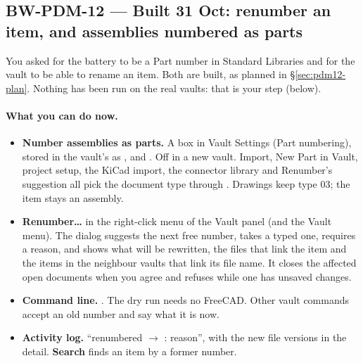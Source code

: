 \subsection{BW-PDM-12 --- Built 31 Oct: renumber an item, and assemblies numbered as parts}\label{sec:pdm12-built}

You asked for the battery to be a Part number in Standard Libraries and for the vault to be able to rename an item.
Both are built, as planned in \S\ref{sec:pdm12-plan}. Nothing has been run on the real vaults: that is your step
(below).

\paragraph{What you can do now.}
\begin{itemize}[nosep]
  \item \textbf{Number assemblies as parts.} A box in Vault Settings (Part numbering), stored in the vault's
         as , and
        . Off in a new vault. Import, New Part in Vault,
        project setup, the KiCad import, the connector library and Renumber's suggestion all pick the document type
        through . Drawings keep type 03; the item stays an assembly.
  \item \textbf{Renumber\ldots} in the right-click menu of the Vault panel (and the Vault menu). The dialog
        suggests the next free number, takes a typed one, requires a reason, and shows what will be rewritten, the
        files that link the item and the items in the neighbour vaults that link its file name. It closes the
        affected open documents when you agree and refuses while one has unsaved changes.
  \item \textbf{Command line.} . The dry run needs no FreeCAD. Other vault commands accept an old number and say what it is now.
  \item \textbf{Activity log.} ``renumbered  $\to$ : reason'', with the new file versions in the
        detail. \textbf{Search} finds an item by a former number.
\end{itemize}

